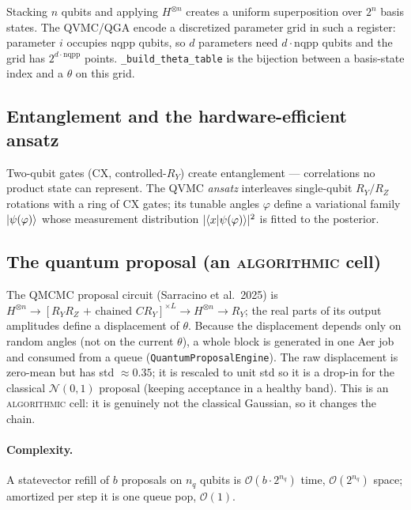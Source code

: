 \documentclass[11pt]{article}
\newcommand{\code}[1]{\texttt{#1}}
\newcommand{\bigO}{\mathcal{O}}
\newcommand{\algorithmic}{\textsc{algorithmic}}
\begin{document}
Stacking $n$ qubits and applying $H^{\otimes n}$ creates a uniform
superposition over $2^n$ basis states. The QVMC/QGA encode a discretized
parameter grid in such a register: parameter $i$ occupies $\mathrm{nqpp}$
qubits, so $d$ parameters need $d\cdot\mathrm{nqpp}$ qubits and the grid has
$2^{d\cdot\mathrm{nqpp}}$ points. \code{\_build\_theta\_table} is the bijection
between a basis-state index and a $\theta$ on this grid.

\subsection{Entanglement and the hardware-efficient ansatz}

Two-qubit gates (CX, controlled-$R_Y$) create entanglement --- correlations no
product state can represent. The QVMC \emph{ansatz} interleaves single-qubit
$R_Y/R_Z$ rotations with a ring of CX gates; its tunable angles $\varphi$
define a variational family $\ket{\psi(\varphi)}$ whose measurement
distribution $|\!\braket{x|\psi(\varphi)}\!|^2$ is fitted to the posterior.

\subsection{The quantum proposal (an \algorithmic{} cell)}

The QMCMC proposal circuit (Sarracino et al.\ 2025) is
$H^{\otimes n}\!\to[R_Y R_Z\text{ + chained }CR_Y]^{\times L}\!\to H^{\otimes
n}\!\to R_Y$; the real parts of its output amplitudes define a displacement of
$\theta$. Because the displacement depends only on random angles (not on the
current $\theta$), a whole block is generated in one Aer job and consumed from
a queue (\code{QuantumProposalEngine}). The raw displacement is zero-mean but
has std $\approx0.35$; it is rescaled to unit std so it is a drop-in for the
classical $\mathcal N(0,1)$ proposal (keeping acceptance in a healthy band).
This is an \algorithmic{} cell: it is genuinely not the classical Gaussian, so
it changes the chain.

\paragraph{Complexity.}
A statevector refill of $b$ proposals on $n_q$ qubits is
$\bigO(b\cdot 2^{n_q})$ time, $\bigO(2^{n_q})$ space; amortized per step it is
one queue pop, $\bigO(1)$.

\end{document}

